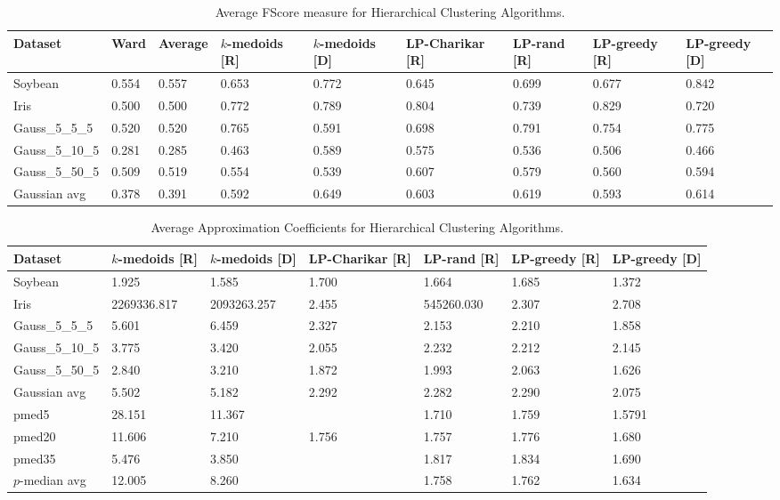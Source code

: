 \documentclass[conference, 10pt, final]{IEEEtran}
\begin{document}
\begin{table}[!t]
\caption{Average FScore measure for Hierarchical Clustering Algorithms.}
\centering
\begin{tabular}{ | l | l | l | l | l | l | l | l| l| }
\hline
Dataset	&	Ward	&	Average	&	$k$-medoids [R]	&	$k$-medoids [D]	&	LP-Charikar [R]	&	LP-rand [R]	&	LP-greedy [R]	&	LP-greedy [D]	\\ \hline
Soybean	&	0.554	&	0.557	&	0.653	&	0.772	&	0.645	&	0.699	&	0.677	&	0.842	\\
Iris	&	0.500	&	0.500	&	0.772	&	0.789	&	0.804	&	0.739	&	0.829	&	0.720	\\
Gauss\_5\_5\_5	&	0.520	&	0.520	&	0.765	&	0.591	&	0.698	&	0.791	&	0.754	&	0.775	\\
Gauss\_5\_10\_5	&	0.281	&	0.285	&	0.463	&	0.589	&	0.575	&	0.536	&	0.506	&	0.466	\\
Gauss\_5\_50\_5	&	0.509	&	0.519	&	0.554	&	0.539	&	0.607	&	0.579	&	0.560	&	0.594	\\
Gaussian avg	&	0.378	&	0.391	&	0.592	&	0.649	&	0.603	&	0.619	&	0.593	&	0.614	\\ \hline
\end{tabular}
\label{fig:hier_results_FScore}
\end{table}


\begin{table}[!t]
\caption{Average Approximation Coefficients for Hierarchical Clustering Algorithms.}
\centering
\begin{tabular}{ | l | l | l | l | l | l| l|}
\hline
Dataset	&	$k$-medoids [R]	&	$k$-medoids [D]	&	LP-Charikar [R]	&	LP-rand [R]	&	LP-greedy [R]	&	LP-greedy [D]	\\ \hline
Soybean	&	1.925	&	1.585	&	1.700	&	1.664	&	1.685	&	1.372	\\
Iris	&	2269336.817	&	2093263.257	&	2.455	&	545260.030	&	2.307	&	2.708	\\
Gauss\_5\_5\_5	&	5.601	&	6.459	&	2.327	&	2.153	&	2.210	&	1.858	\\
Gauss\_5\_10\_5	&	3.775	&	3.420	&	2.055	&	2.232	&	2.212	&	2.145	\\
Gauss\_5\_50\_5	&	2.840	&	3.210	&	1.872	&	1.993	&	2.063	&	1.626	\\
Gaussian avg	&	5.502	&	5.182	&	2.292	&	2.282	&	2.290	&	2.075	\\
pmed5	&	28.151	&	11.367	&		&	1.710	&	1.759	&	1.5791	\\
pmed20	&	11.606	&	7.210	&	1.756	&	1.757	&	1.776	&	1.680	\\
pmed35	&	5.476	&	3.850	&		&	1.817	&	1.834	&	1.690	\\
$p$-median avg	&	12.005	&	8.260	&		&	1.758	&	1.762	&	1.634	\\ \hline
\end{tabular}
\label{fig:hier_results_approx}
\end{table}
\end{document}
